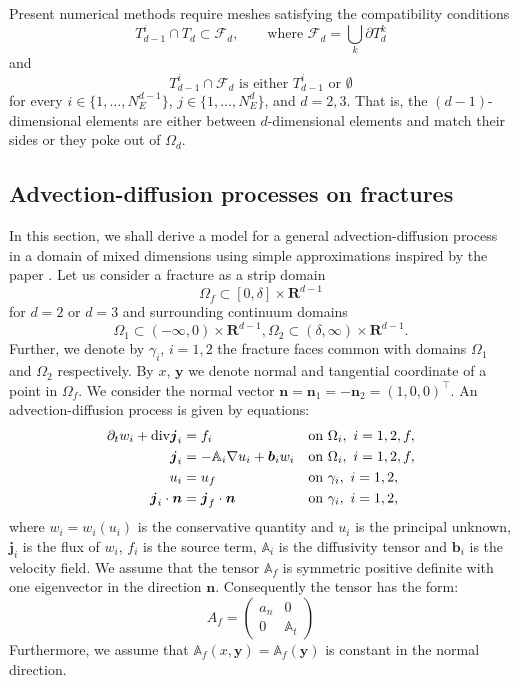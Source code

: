 \documentclass[a4paper]{article}
\def\prtl{\partial}
\def\vc#1{\mathbf{\boldsymbol{#1}}}     %
\def\tn#1{{\mathbb{#1}}}    %
\def\div{{\rm div}}
\def\grad{\nabla}
\def\Real{{\mathbf R}}
\begin{document}
Present numerical methods require meshes satisfying the compatibility conditions
\begin{equation}
        T_{d-1}^i \cap T_d \subset \mathcal{F}_d,   \qquad \text{where } \mathcal{F}_d = \bigcup_{k} \partial T_{d}^{k}
\end{equation}
and
\begin{equation}
        T_{d-1}^i \cap \mathcal{F}_d    \text{ is either $T_{d-1}^i$ or $\emptyset$}    
\end{equation}
for every $i\in\{1,\dots, N_{E}^{d-1}\}$, $j\in\{1,\dots,N_{E}^{d}\}$,  and $d=2,3$. That is, the $(d-1)$-dimensional elements are either between $d$-dimensional elements and
match their sides or they poke out of $\Omega_d$. 

\subsection{Advection-diffusion processes on fractures}
\label{sc:ad_on_fractures}
In this section, we shall derive a model for a general advection-diffusion process in a domain of mixed dimensions using
simple approximations inspired by the paper \citet{martin_modeling_2005}. Let us consider a fracture as a strip domain 
\[
 \Omega_f \subset [0,\delta] \times \Real^{d-1}
\]
for $d=2$ or $d=3$ and surrounding continuum domains
\[
 \Omega_1 \subset (-\infty,0)\times \Real^{d-1},
 \Omega_2 \subset (\delta,\infty)\times \Real^{d-1}.
\]
Further, we denote by $\gamma_i$, $i=1,2$ the fracture faces common with domains $\Omega_1$ and $\Omega_2$ respectively.
By $x$, $\vc y$ we denote normal and tangential coordinate of a point in $\Omega_f$. 
We consider the normal vector  $\vc n=\vc n_1=-\vc n_2=(1,0,0)^\top$.
An advection-diffusion process is given by equations:
\begin{align}
  \label{eq:fr:continuity}
  \prtl_t w_i + \div \vc j_i &= f_i&&  \text{on } \Omega_i,\ i=1,2,f,\\
  \label{eq:fr:flux}
  \vc j_i &= - \tn A_i\grad u_i + \vc b_i w_i&& \text{on } \Omega_i,\ i=1,2,f,\\
  \label{eq:fr:Dirichlet}
  u_i &= u_f&& \text{on } \gamma_i,\ i=1,2,\\
  \label{eq:fr:Neumann}
  \vc j_i \cdot \vc n &= \vc j_f \cdot \vc n&& \text{on } \gamma_i,\ i=1,2,
\end{align}
where $w_i=w_i(u_i)$ is the conservative quantity and $u_i$ is the principal unknown, $\vc j_i$ is the flux of $w_i$, $f_i$ is the source term,
$\tn A_i$ is the diffusivity tensor and $\vc b_i$ is the velocity field. We assume that the tensor $\tn A_f$ is symmetric positive definite 
with one eigenvector in the direction $\vc n$. Consequently the tensor has the form:
\[
 A_f = \begin{pmatrix} 
            a_n & 0  \\
            0 & \tn A_t
       \end{pmatrix}
\]
Furthermore, we assume that $\tn A_f(x, \vc y)=\tn A_f(\vc y)$ is constant in the normal direction.
\end{document}
